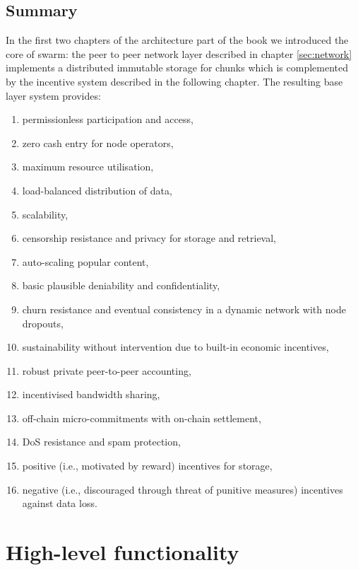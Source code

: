 \section{Summary}


In the first two chapters of the architecture part of the book we introduced the core of swarm: the peer to peer network layer described in chapter \ref{sec:network} implements a distributed immutable storage for chunks which is complemented by the incentive system described in the following chapter. The resulting base layer system provides:

\begin{enumerate}
    \item permissionless participation and access,
    \item zero cash entry for node operators,
    \item maximum resource utilisation, 
    \item load-balanced distribution of data,
    \item scalability, 
    \item censorship resistance and privacy for storage and retrieval,
    \item auto-scaling popular content,
    \item basic plausible deniability and confidentiality,
    \item churn resistance and eventual consistency in a dynamic network with node dropouts,
    \item sustainability without intervention due to built-in economic incentives,
    \item robust private peer-to-peer accounting, 
    \item incentivised bandwidth sharing,
    \item off-chain micro-commitments with on-chain settlement,
    \item DoS resistance and spam protection,
    \item positive (i.e., motivated by reward) incentives for storage,
    \item negative (i.e., discouraged through threat of punitive measures) incentives against data loss.
\end{enumerate}


\chapter{High-level functionality}\label{sec:high-level-functionality}


